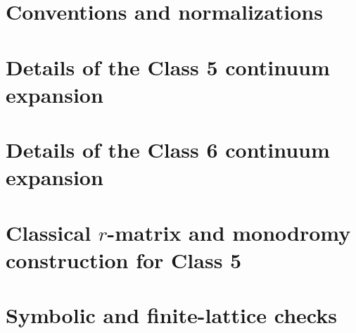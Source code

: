 \appendix

\section{Conventions and normalizations}

\section{Details of the Class 5 continuum expansion}

\section{Details of the Class 6 continuum expansion}

\section{Classical \texorpdfstring{$r$}{r}-matrix and monodromy construction for Class 5}

\section{Symbolic and finite-lattice checks}
